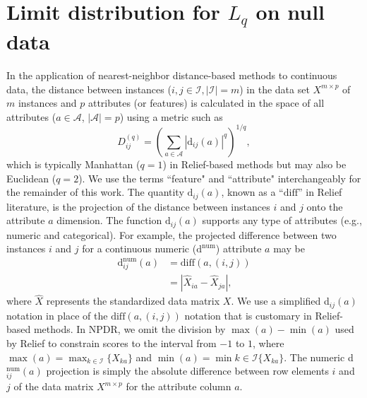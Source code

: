 \documentclass[aos]{imsart}
\begin{document}
\section{Limit distribution for \texorpdfstring{$L_q$}{} on null data}\label{sec:notation_and_CLT}
In the application of nearest-neighbor distance-based methods to continuous data, the distance between instances ($i,j \in \mathcal{I}, |\mathcal{I}|=m$) in the data set $X^{m \times p}$ of $m$ instances and $p$ attributes (or features) is calculated in the space of all attributes ($a \in \mathcal{A}$, $|\mathcal{A}|=p$) using a metric such as
\begin{equation}\label{eq:D}
D^{(q)}_{ij}=\left(\sum_{a\in \mathcal{A}}|\text{d}_{ij}(a)|^q\right)^{1/q},
\end{equation}
which is typically Manhattan ($q=1$) in Relief-based methods but may also be Euclidean ($q=2$). We use the terms ``feature" and ``attribute" interchangeably for the remainder of this work. The quantity 
$\text{d}_{ij}(a)$,
known as a ``$\text{diff}$'' in Relief literature, is the projection of the distance between instances $i$ and $j$ onto the attribute $a$ dimension. The 
function $\text{d}_{ij}(a)$ supports any type of attributes
(e.g., numeric and categorical).
For example, the projected difference between two instances $i$ and $j$ for a continuous numeric ($\text{d}^{\text{num}}$) attribute $a$ may be
\begin{equation}\label{eq:diff}
\begin{aligned}
\text{d}^{\text{num}}_{ij}(a)&=\text{diff}(a,(i,j))\\
& = {|\hat{X}_{ia}-\hat{X}_{ja}|},
\end{aligned}
\end{equation}
where $\hat{X}$ represents the standardized data matrix $X$.
We use a simplified d$_{ij}(a)$ notation in place of the $\text{diff}(a,(i,j))$ notation that is customary in Relief-based methods.
In NPDR, we omit the division by $\max(a)-\min(a)$ used by Relief to constrain scores to the interval from $-1$ to $1$, where $\max(a) = \max_{k \in \mathcal{I}}\{X_{ka}\}$ and $\min(a) = \min{k \in \mathcal{I}}\{X_{ka}\}$. The numeric d$^{\text{num}}_{ij}(a)$ projection is simply the absolute difference between row elements $i$ and $j$ of the data matrix $X^{m \times p}$ for the attribute column $a$. 
\end{document}
